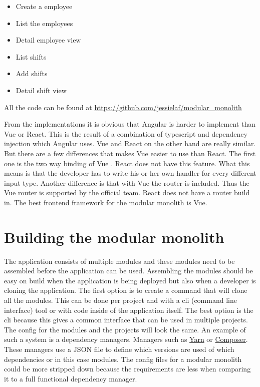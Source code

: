 \begin{itemize}
    \item Create a employee
    \item List the employees
    \item Detail employee view
    \item List shifts
    \item Add shifts
    \item Detail shift view
\end{itemize}

All the code can be found at \url{https://github.com/jessielaf/modular_monolith}

From the implementations it is obvious that Angular is harder to implement than Vue or React. This is the result of a combination of typescript and dependency injection which Angular uses. Vue and React on the other hand are really similar. But there are a few differences that makes Vue easier to use than React. The first one is the two way binding of Vue \cite{vueTwoWay}. React does not have this feature. What this means is that the developer has to write his or her own handler for every different input type. Another difference is that with Vue the router is included. Thus the Vue router is supported by the official team. React does not have a router build in. The best frontend framework for the modular monolith is Vue.

\section{Building the modular monolith}
\label{sec:BuildingModularMonolith}

The application consists of multiple modules and these modules need to be assembled before the application can be used. Assembling the modules should be easy on build when the application is being deployed but also when a developer is cloning the application. The first option is to create a command that will clone all the modules. This can be done per project and with a cli (command line interface) tool or with code inside of the application itself. The best option is the cli because this gives a common interface that can be used in multiple projects. The config for the modules and the projects will look the same. An example of such a system is a dependency managers. Managers such as \href{https://yarnpkg.com/en/}{Yarn} or \href{https://getcomposer.org/}{Composer}. These managers use a JSON file to define which versions are used of which dependencies or in this case modules. The config files for a modular monolith could be more stripped down because the requirements are less when comparing it to a full functional dependency manager.


